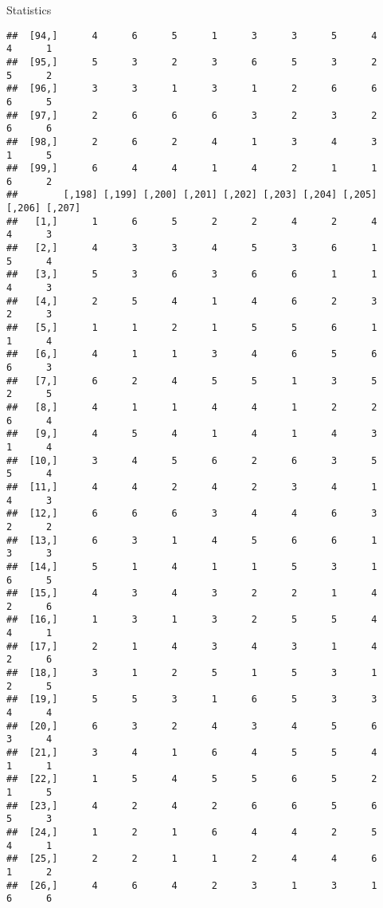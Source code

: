 \documentclass[
  ignorenonframetext,
]{beamer}
\begin{document}
\begin{frame}[fragile]{Statistics}
\begin{verbatim}
##  [94,]      4      6      5      1      3      3      5      4      4      1
##  [95,]      5      3      2      3      6      5      3      2      5      2
##  [96,]      3      3      1      3      1      2      6      6      6      5
##  [97,]      2      6      6      6      3      2      3      2      6      6
##  [98,]      2      6      2      4      1      3      4      3      1      5
##  [99,]      6      4      4      1      4      2      1      1      6      2
##        [,198] [,199] [,200] [,201] [,202] [,203] [,204] [,205] [,206] [,207]
##   [1,]      1      6      5      2      2      4      2      4      4      3
##   [2,]      4      3      3      4      5      3      6      1      5      4
##   [3,]      5      3      6      3      6      6      1      1      4      3
##   [4,]      2      5      4      1      4      6      2      3      2      3
##   [5,]      1      1      2      1      5      5      6      1      1      4
##   [6,]      4      1      1      3      4      6      5      6      6      3
##   [7,]      6      2      4      5      5      1      3      5      2      5
##   [8,]      4      1      1      4      4      1      2      2      6      4
##   [9,]      4      5      4      1      4      1      4      3      1      4
##  [10,]      3      4      5      6      2      6      3      5      5      4
##  [11,]      4      4      2      4      2      3      4      1      4      3
##  [12,]      6      6      6      3      4      4      6      3      2      2
##  [13,]      6      3      1      4      5      6      6      1      3      3
##  [14,]      5      1      4      1      1      5      3      1      6      5
##  [15,]      4      3      4      3      2      2      1      4      2      6
##  [16,]      1      3      1      3      2      5      5      4      4      1
##  [17,]      2      1      4      3      4      3      1      4      2      6
##  [18,]      3      1      2      5      1      5      3      1      2      5
##  [19,]      5      5      3      1      6      5      3      3      4      4
##  [20,]      6      3      2      4      3      4      5      6      3      4
##  [21,]      3      4      1      6      4      5      5      4      1      1
##  [22,]      1      5      4      5      5      6      5      2      1      5
##  [23,]      4      2      4      2      6      6      5      6      5      3
##  [24,]      1      2      1      6      4      4      2      5      4      1
##  [25,]      2      2      1      1      2      4      4      6      1      2
##  [26,]      4      6      4      2      3      1      3      1      6      6

\end{verbatim}
\end{frame}
\end{document}
